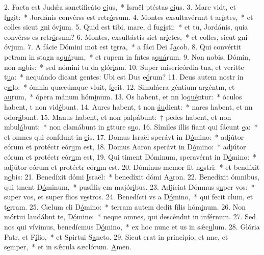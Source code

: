 2. Facta est Judǽa sanctificáto \uline{e}jus,~* Israël ptéstas \uline{e}jus.
3. Mare vidt, et f\uline{u}git:~* Jordánis convérss est retr\uline{ó}rsum.
4. Montes exsultavérunt t ar\uline{í}etes,~* et colles sicut gni óv\uline{i}um.
5. Quid est tibi, mare, d fug\uline{í}sti:~* et tu, Jordánis, quia convérss es retr\uline{ó}rsum?
6. Montes, exsultástis sict ar\uline{í}etes,~* et colles, sicut gni óv\uline{i}um.
7. A fácie Dómini mot est t\uline{e}rra,~* a fáci Dei J\uline{a}cob.
8. Qui convértit petram in stagn a\uline{quá}rum,~* et rupem in fntes a\uline{quá}rum.
9. Non nobis, Dómin, non n\uline{o}bis:~* sed nómini tu da glór\uline{i}am.
10. Super misericórdia tua, et veritte t\uline{u}a:~* nequándo dicant gentes: Ubi est Dus e\uline{ó}rum?
11. Deus autem nostr in c\uline{æ}lo:~* ómnia quæcúmque vluit, f\uline{e}cit.
12. Simulácra géntium argéntm, et \uline{au}rum,~* ópera mánum hóm\uline{i}num.
13. Os habent, et nn lo\uline{qué}ntur:~* óculos habent, t non vid\uline{é}bunt.
14. Aures habent, t non \uline{áu}dient:~* nares habent, et nn odor\uline{á}bunt.
15. Manus habent, et non palpábunt:~† pedes habent, et non mbul\uline{á}bunt:~* non clamábunt in gtture s\uline{u}o.
16. Símiles illis fiant qui fácunt \uline{e}a:~* et omnes qui confdunt in \uline{e}is.
17. Domus Israël sperávt in D\uline{ó}mino:~* adjútor eórum et protéctr eór\uline{u}m est,
18. Domus Aaron sperávt in D\uline{ó}mino:~* adjútor eórum et protéctr eór\uline{u}m est,
19. Qui timent Dóminum, speravérnt in D\uline{ó}mino:~* adjútor eórum et protéctr eór\uline{u}m est.
20. Dóminus memor fit n\uline{o}stri:~* et bendíxit n\uline{o}bis:
21. Benedíxit dómi \uline{I}sraël:~* benedíxit dómi A\uline{a}ron.
22. Benedíxit ómnibus, qui tment D\uline{ó}minum,~* pusíllis cm majór\uline{i}bus.
23. Adjíciat Dómnus s\uline{u}per vos:~* super vos, et super flios v\uline{e}stros.
24. Benedícti vs a D\uline{ó}mino,~* qui fecit clum, et t\uline{e}rram.
25. Cælum cli D\uline{ó}mino:~* terram autem dedit fílis hóm\uline{i}num.
26. Non mórtui laudábnt te, D\uline{ó}mine:~* neque omnes, qui descéndnt in inf\uline{é}rnum.
27. Sed nos qui vívimus, benedícmus D\uline{ó}mino,~* ex hoc nunc et us in sǽc\uline{u}lum.
28. Glória Patr, et F\uline{í}lio,~* et Spirtui S\uline{a}ncto.
29. Sicut erat in princípio, et nnc, et s\uline{e}mper,~* et in sǽcula sæclórum. \uline{A}men.
